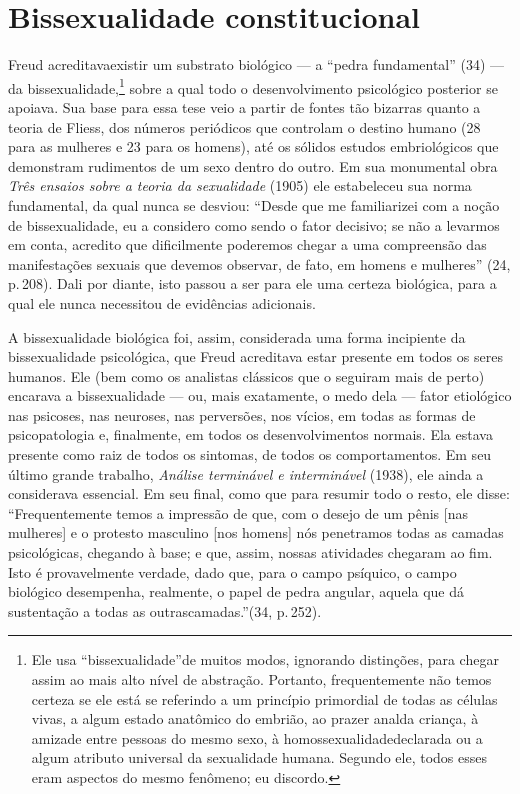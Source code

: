 \section{Bissexualidade constitucional}


  Freud acreditava\idxfreudanali[|(] existir um substrato biológico --- a ``pedra
fundamental'' (34) --- da bissexualidade,\footnote{ Ele usa
``bissexualidade''\idxbisse[|nn] de muitos modos, ignorando
distinções, para chegar assim ao mais alto nível de abstração.
Portanto, frequentemente não temos certeza se ele está se referindo a
um princípio primordial de todas as células vivas, a algum estado
anatômico do embrião, ao prazer anal\idxfanal[|nn] da criança, à amizade entre
pessoas do mesmo sexo, à homossexualidade\idxhomos[|nn] declarada ou a algum atributo
universal da sexualidade humana. Segundo ele, todos esses eram aspectos
do mesmo fenômeno; eu discordo.} sobre a qual todo o desenvolvimento
psicológico posterior se apoiava. Sua base para essa tese veio a partir
de fontes tão bizarras quanto a teoria de Fliess,\idxflies{} dos números
periódicos que controlam o destino humano (28 para as mulheres e 23
para os homens), até os sólidos estudos \mbox{embriológicos} que demonstram
rudimentos de um sexo dentro do outro. Em sua monumental obra
\textit{Três ensaios sobre a teoria da sexualidade}\idxfreudessay{} (1905) ele
estabeleceu sua norma fundamental, da qual nunca se desviou:
``Desde que me familiarizei com a noção de bissexualidade,\idxbisse{} eu a considero como sendo o fator decisivo; se não a levarmos em conta,
 acredito que dificilmente poderemos chegar a uma compreensão das
manifestações sexuais que devemos observar, de fato, em homens e
mulheres'' (24, p.\,208). Dali por diante, isto passou a
ser para ele uma certeza biológica, para a qual ele nunca necessitou de
evidências adicionais.

 A bissexualidade biológica foi, assim, considerada uma forma incipiente
da bissexualidade psicológica, que Freud acreditava estar presente em
todos os seres humanos. Ele (bem como os analistas clássicos que o
seguiram mais de perto) encarava a bissexualidade --- ou, mais
exatamente, o medo dela --- fator etiológico nas psicoses, nas neuroses,
nas perversões, nos vícios, em todas as formas de psicopatologia e,
finalmente, em todos os desenvolvimentos normais. Ela estava presente
como raiz de todos os sintomas, de todos os comportamentos. Em seu
último grande trabalho, \textit{Análise terminável e interminável}
(1938), ele ainda a considerava essencial. Em seu final, como que para
resumir todo o resto, ele disse: ``Frequentemente temos a
impressão de que, com o desejo de um\idxinvej{} pênis [nas mulheres] e o protesto
masculino [nos homens] nós penetramos todas as camadas psicológicas,
chegando à base; e que, assim, nossas atividades chegaram ao fim. Isto
é provavelmente verdade, dado que, para o campo psíquico, o campo
biológico desempenha, realmente, o papel de pedra angular, aquela que
dá sustentação a todas as outras\idxfreudanali[|)] camadas.''\idxfreud[|)] (34, p.\,252).

